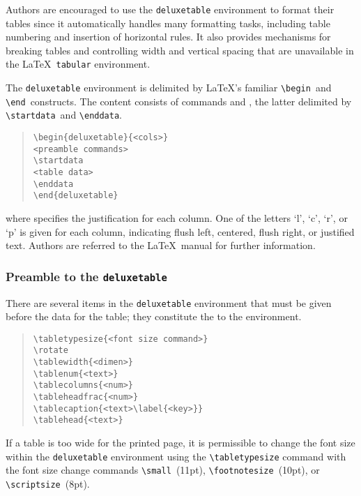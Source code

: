 \documentclass[preprint2]{aastex}
\begin{document}
Authors are encouraged to use the 
\texttt{deluxetable} environment to format their tables since it automatically 
handles many formatting tasks, including table numbering and insertion 
of horizontal rules. It also provides mechanisms for breaking tables and 
controlling width and vertical spacing that are unavailable in the \LaTeX\ 
\texttt{tabular} environment. 
 
The \texttt{deluxetable} environment 
is delimited by \LaTeX's familiar 
\verb"\begin"\  and \verb"\end"\  constructs. 
The content consists of  commands and , 
the latter delimited by \verb"\startdata"\ 
 and \verb"\enddata". 
\begin{quote} 
\begin{verbatim} 
\begin{deluxetable}{<cols>} 
<preamble commands> 
\startdata 
<table data> 
\enddata 
\end{deluxetable} 
\end{verbatim} 
\end{quote} 
where  specifies the justification for each col\-umn. 
One of the letters `l', `c', `r', or `p' is given for each column, 
indicating flush left, centered, flush right, or justified text. 
Authors are 
referred to the \LaTeX\ manual \citep{Lamport} for further information. 
 
\subsubsection{Preamble to the {\tt deluxetable}} 
 
There are several items in the 
\texttt{deluxetable} environment 
that 
must be given before the data for the table; 
they constitute the  to the environment. 
\begin{quote} 
\begin{verbatim} 
\tabletypesize{<font size command>}
\rotate 
\tablewidth{<dimen>} 
\tablenum{<text>} 
\tablecolumns{<num>} 
\tableheadfrac{<num>} 
\tablecaption{<text>\label{<key>}} 
\tablehead{<text>} 
\end{verbatim} 
\end{quote} 
 
If a table is too wide for the printed page, it is permissible to change 
the font size within the 
\texttt{deluxetable} environment 
using the \verb"\tabletypesize" command with the font size change commands
\verb"\small"\ 
 (11pt), \verb"\footnotesize"\ 
 (10pt), or  
\verb"\scriptsize"\ 
 (8pt). 
 
\end{document}
